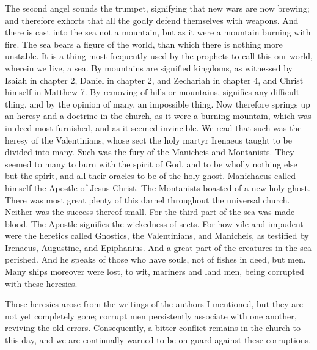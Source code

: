 The second angel sounds the trumpet, signifying that new wars are now brewing; and therefore exhorts that all the godly defend themselves with weapons. And there is cast into the sea not a mountain, but as it were a mountain burning with fire. The sea bears a figure of the world, than which there is nothing more unstable. It is a thing most frequently used by the prophets to call this our world, wherein we live, a sea. By mountains are signified kingdoms, as witnessed by Isaiah in chapter 2, Daniel in chapter 2, and Zechariah in chapter 4, and Christ himself in Matthew 7. By removing of hills or mountains, signifies any difficult thing, and by the opinion of many, an impossible thing. Now therefore springs up an heresy and a doctrine in the church, as it were a burning mountain, which was in deed most furnished, and as it seemed invincible. We read that such was the heresy of the Valentinians, whose sect the holy martyr Irenaeus taught to be divided into many. Such was the fury of the Manicheis and Montanists. They seemed to many to burn with the spirit of God, and to be wholly nothing else but the spirit, and all their oracles to be of the holy ghost. Manichaeus called himself the Apostle of Jesus Christ. The Montanists boasted of a new holy ghost. There was most great plenty of this darnel throughout the universal church. Neither was the success thereof small. For the third part of the sea was made blood. The Apostle signifies the wickedness of sects. For how vile and impudent were the heretics called Gnostics, the Valentinians, and Manicheis, as testified by Irenaeus, Augustine, and Epiphanius. And a great part of the creatures in the sea perished. And he speaks of those who have souls, not of fishes in deed, but men. Many ships moreover were lost, to wit, mariners and land men, being corrupted with these heresies.

Those heresies arose from the writings of the authors I mentioned, but they are not yet completely gone; corrupt men persistently associate with one another, reviving the old errors. Consequently, a bitter conflict remains in the church to this day, and we are continually warned to be on guard against these corruptions.

